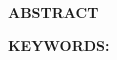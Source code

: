 \pagestyle{artimain}

\begin{center}
\textbf{ \titlethesisENG}
\\[2em]
\textbf{ ABSTRACT}
\end{center}

\vspace{2em} 
\vspace{2em}\par\textbf{ KEYWORDS: }